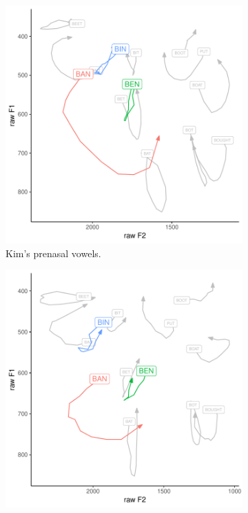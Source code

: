 \begin{figure}[tb!]
    \centering
    \hspace{\fill}
    \begin{subfigure}[t]{2.925in}
        \centering
        \includegraphics[width = \textwidth]{Figures/example_plots/24-Kim_avg_prenasal.pdf}
        \caption{Kim's prenasal vowels.}
        \label{fig:kim_prenasal}
    \end{subfigure}
    \hspace{\fill}
    \begin{subfigure}[t]{2.925in}
        \centering
        \includegraphics[width = \textwidth]{Figures/example_plots/48-Holly_avg_prenasal.pdf}

\end{subfigure}
\end{figure}
